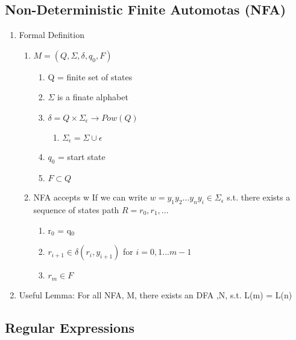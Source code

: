 \documentclass[11pt]{article}
\begin{document}
\subsection{Non-Deterministic Finite Automotas (NFA)}
\label{sec-2.2}

\begin{enumerate}
\item Formal Definition

\begin{enumerate}
\item $M = (Q,\Sigma,\delta,q_0,F)$

\begin{enumerate}
\item Q = finite set of states
\item $\Sigma$  is a finate alphabet
\item $\delta = Q \times \Sigma_\epsilon \rightarrow Pow(Q)$

\begin{enumerate}
\item $\Sigma_\epsilon = \Sigma \cup {\epsilon}$
\end{enumerate}

\item $q_0$ = start state
\item $F \subset Q$
\end{enumerate}

\item NFA accepts w If we can write $w = {y_1 y_2 ... y_n
         y_i \in \Sigma_\epsilon}$ s.t. there exists a sequence of
         states path $R = {r_0,r_1,...}$

\begin{enumerate}
\item r$_0$ = q$_0$
\item $r_{i+1}\in\delta(r_i,y_{i+1})$ for $i=0,1...m-1$
\item $r_m \in F$
\end{enumerate}

\end{enumerate}

\item Useful Lemma: For all NFA, M, there exists an DFA ,N, s.t. L(m)
      = L(n)
\end{enumerate}
\subsection{Regular Expressions}
\label{sec-2.3}
\end{document}
